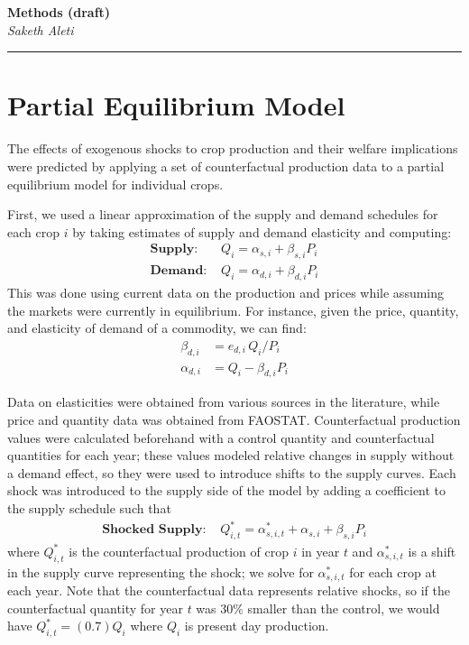 \documentclass[12pt]{article}
\begin{document}
\begin{center}
 	\large\textbf{Methods (draft)}\\
 	\small\textit{Saketh Aleti}
\end{center}
\rule{\textwidth}{1pt}

	
\section{Partial Equilibrium Model}	

The effects of exogenous shocks to crop production and their welfare implications were predicted by applying a set of counterfactual production data to a partial equilibrium model for individual crops. 

First, we used a linear approximation of the supply and demand schedules for each crop $i$ by taking estimates of supply and demand elasticity and computing:
\begin{subequations}
	\begin{align}
	\textbf{Supply: } & Q_{i} = \alpha_{s, i} + \beta_{s, i} P_i 				\\
	\textbf{Demand: } & Q_{i} = \alpha_{d, i} + \beta_{d, i} P_i 	
	\end{align}
\end{subequations}
This was done using current data on the production and prices while assuming the markets were currently in equilibrium. For instance, given the price, quantity, and elasticity of demand of a commodity, we can find:  
\begin{align*}
\beta_{d, i}  &= e_{d, i} \, Q_{i} / P_{i} \\
\alpha_{d, i} &= Q_{i} - \beta_{d, i} P_{i}
\end{align*}

Data on elasticities were obtained from various sources in the literature, while price and quantity data was obtained from FAOSTAT. Counterfactual production values were calculated beforehand with a control quantity and counterfactual quantities for each year; these values modeled relative changes in supply without a demand effect, so they were used to introduce shifts to the supply curves. 
Each shock was introduced to the supply side of the model by adding a coefficient to the supply schedule such that
\begin{subequations}
	\begin{align}
		\textbf{Shocked Supply: } & Q_{i, t}^* = \alpha_{s, i, t}^* + \alpha_{s, i} + \beta_{s, i} P_{i}
	\end{align}
\end{subequations}		
where $Q_{i, t}^*$ is the counterfactual production of crop $i$ in year $t$ and $\alpha_{s, i, t}^*$ is a shift in the supply curve representing the shock; we solve for $\alpha_{s, i, t}^*$ for each crop at each year. Note that the counterfactual data represents relative shocks, so if the counterfactual quantity for year $t$ was $30\%$ smaller than the control, we would have $Q_{i, t}^* = (0.7)Q_i$ where $Q_i$ is present day production. 
\end{document}
